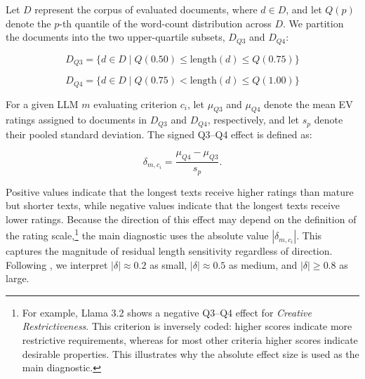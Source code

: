 Let $D$ represent the corpus of evaluated documents, where $d \in D$, and let $Q(p)$ denote the $p$-th quantile of the word-count distribution across $D$. We partition the documents into the two upper-quartile subsets, $D_{Q3}$ and $D_{Q4}$:

\[
D_{Q3} = \{d \in D \mid Q(0.50) \le \text{length}(d) \le Q(0.75)\}
\]

\[
D_{Q4} = \{d \in D \mid Q(0.75) < \text{length}(d) \le Q(1.00)\}
\]

For a given LLM $m$ evaluating criterion $c_i$, let $\mu_{Q3}$ and $\mu_{Q4}$ denote the mean EV ratings assigned to documents in $D_{Q3}$ and $D_{Q4}$, respectively, and let $s_p$ denote their pooled standard deviation. The signed Q3--Q4 effect is defined as:

\[
\delta_{m,c_i} = \frac{\mu_{Q4} - \mu_{Q3}}{s_p}.
\]

Positive values indicate that the longest texts receive higher ratings than mature but shorter texts, while negative values indicate that the longest texts receive lower ratings. Because the direction of this effect may depend on the definition of the rating scale,\footnote{For example, Llama 3.2 shows a negative Q3--Q4 effect for \textit{Creative Restrictiveness}. This criterion is inversely coded: higher scores indicate more restrictive requirements, whereas for most other criteria higher scores indicate desirable properties. This illustrates why the absolute effect size is used as the main diagnostic.} the main diagnostic uses the absolute value $|\delta_{m,c_i}|$. This captures the magnitude of residual length sensitivity regardless of direction. Following \citet{cohen1988statistical}, we interpret $|\delta| \approx 0.2$ as small, $|\delta| \approx 0.5$ as medium, and $|\delta| \ge 0.8$ as large.




